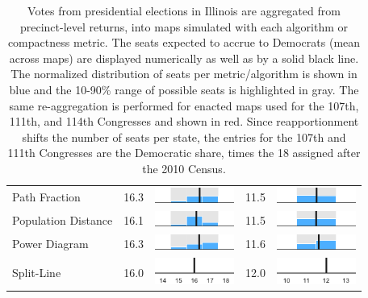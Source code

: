 \begin{table}
\begin{tabular}{l rm{7em} rm{7em}}
Path Fraction          &  16.3 &    \includegraphics[width=7em]{mini_hist/IL_2008_path_frac} &  11.5 &    \includegraphics[width=7em]{mini_hist/IL_2016_path_frac} \\
Population Distance    &  16.1 &       \includegraphics[width=7em]{mini_hist/IL_2008_dist_p} &  11.5 &       \includegraphics[width=7em]{mini_hist/IL_2016_dist_p} \\
Power Diagram          &  16.3 &        \includegraphics[width=7em]{mini_hist/IL_2008_power} &  11.6 &        \includegraphics[width=7em]{mini_hist/IL_2016_power} \\
Split-Line             &  16.0 &        \includegraphics[width=7em]{mini_hist/IL_2008_split_ax} &  12.0 &        \includegraphics[width=7em]{mini_hist/IL_2016_split_ax} \\
\hline \hline
\end{tabular}
\caption{Votes from presidential elections in Illinois are aggregated from precinct-level returns, into maps simulated with each algorithm or compactness metric. 
             The seats expected to accrue to Democrats (mean across maps) are displayed numerically as well as by a solid black line.
             The normalized distribution of seats per metric/algorithm is shown in blue and the 10-90\% range of possible seats is highlighted in gray.
             The same re-aggregation is performed for enacted maps used for the 107th, 111th, and 114th Congresses and shown in red.
             Since reapportionment shifts the number of seats per state,
               the entries for the 107th and 111th Congresses are the Democratic share,
               times the 18 assigned after the 2010 Census.
             }\label{tab:IL_seats}
\end{table}
 